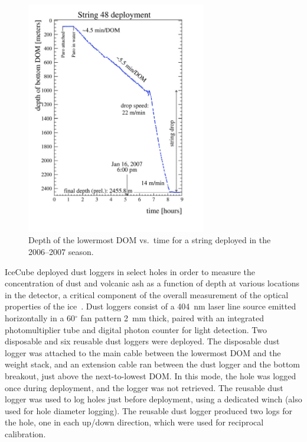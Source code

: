 \begin{figure}[!ht]
 \centering
 \includegraphics[width=0.70\textwidth]{graphics/drill/String48_profile.pdf}
\caption{Depth of the lowermost DOM vs.~time for a string deployed in the
  2006--2007 season.}
\label{fig:deploytime}
\end{figure}

IceCube deployed dust loggers in select holes in order to measure the
concentration of dust and volcanic ash as a function of depth at various
locations in the detector, a critical component of the overall measurement
of the optical properties of the ice~\cite{Aartsen:2013rt,citeulike:2998650}. Dust loggers 
consist of a 404~nm laser line source emitted horizontally in a
60$^{\circ}$ fan pattern 2~mm thick, paired with an integrated
photomultiplier tube and digital photon counter for light detection. Two
disposable and six reusable dust loggers were deployed. The disposable dust
logger was attached to the main cable between the lowermost DOM and the
weight stack, and an extension cable ran between the dust logger and the
bottom breakout, just above the next-to-lowest DOM. In this mode, the hole
was logged once during deployment, and the logger was not
retrieved. The reusable dust logger was used to
log holes just before deployment, using a dedicated winch (also used for
hole diameter logging). The reusable dust logger produced two logs for the
hole, one in each up/down direction, which were used for
reciprocal calibration.


